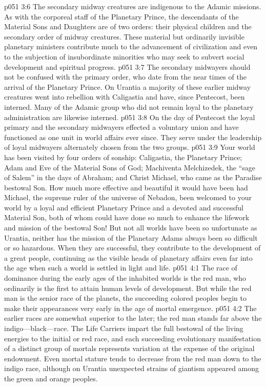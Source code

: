 \pc \vs p051 3:6 The secondary midway creatures are indigenous to the Adamic missions. As with the corporeal staff of the Planetary Prince, the descendants of the Material Sons and Daughters are of two orders: their physical children and the secondary order of midway creatures. These material but ordinarily invisible planetary ministers contribute much to the advancement of civilization and even to the subjection of insubordinate minorities who may seek to subvert social development and spiritual progress.
\vs p051 3:7 The secondary midwayers should not be confused with the primary order, who date from the near times of the arrival of the Planetary Prince. On Urantia a majority of these earlier midway creatures went into rebellion with Caligastia and have, since Pentecost, been interned. Many of the Adamic group who did not remain loyal to the planetary administration are likewise interned.
\vs p051 3:8 On the day of Pentecost the loyal primary and the secondary midwayers effected a voluntary union and have functioned as one unit in world affairs ever since. They serve under the leadership of loyal midwayers alternately chosen from the two groups.
\pc \vs p051 3:9 Your world has been visited by four orders of sonship: Caligastia, the Planetary Prince; Adam and Eve of the Material Sons of God; Machiventa Melchizedek, the “sage of Salem” in the days of Abraham; and Christ Michael, who came as the Paradise bestowal Son. How much more effective and beautiful it would have been had Michael, the supreme ruler of the universe of Nebadon, been welcomed to your world by a loyal and efficient Planetary Prince and a devoted and successful Material Son, both of whom could have done so much to enhance the lifework and mission of the bestowal Son! But not all worlds have been so unfortunate as Urantia, neither has the mission of the Planetary Adams always been so difficult or so hazardous. When they are successful, they contribute to the development of a great people, continuing as the visible heads of planetary affairs even far into the age when such a world is settled in light and life.
\vs p051 4:1 The race of dominance during the early ages of the inhabited worlds is the red man, who ordinarily is the first to attain human levels of development. But while the red man is the senior race of the planets, the succeeding colored peoples begin to make their appearances very early in the age of mortal emergence.
\vs p051 4:2 The earlier races are somewhat superior to the later; the red man stands far above the indigo---black---race. The Life Carriers impart the full bestowal of the living energies to the initial or red race, and each succeeding evolutionary manifestation of a distinct group of mortals represents variation at the expense of the original endowment. Even mortal stature tends to decrease from the red man down to the indigo race, although on Urantia unexpected strains of giantism appeared among the green and orange peoples.
